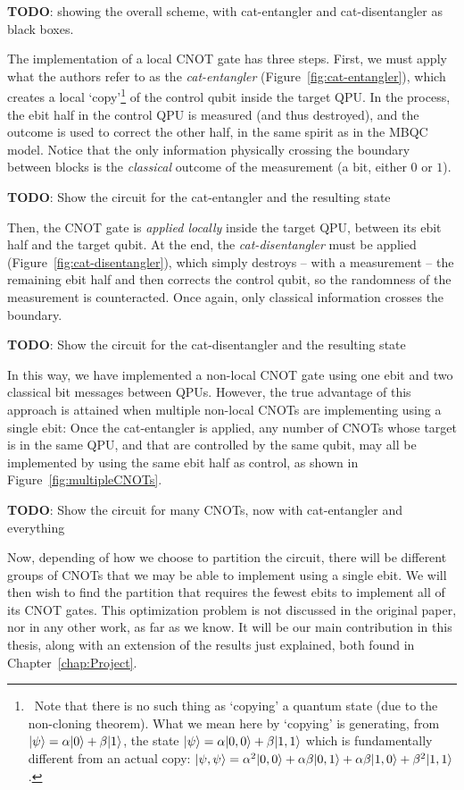 \textbf{TODO}: showing the overall scheme, with cat-entangler and cat-disentangler as black boxes.

The implementation of a local CNOT gate has three steps. First, we must apply what the authors refer to as the \textit{cat-entangler} (Figure~\ref{fig:cat-entangler}), which creates a local `copy'\footnote{\, Note that there is no such thing as `copying' a quantum state (due to the non-cloning theorem). What we mean here by `copying' is generating, from \(\vert \psi \rangle = \alpha\vert 0 \rangle + \beta\vert 1 \rangle\), the state \(\vert \psi \rangle = \alpha\vert 0,0 \rangle + \beta\vert 1,1 \rangle\) which is fundamentally different from an actual copy: \(\vert \psi,\psi \rangle = \alpha^2\vert 0,0 \rangle + \alpha\beta\vert 0,1 \rangle + \alpha\beta\vert 1,0 \rangle + \beta^2\vert 1,1 \rangle\).} of the control qubit inside the target QPU. In the process, the ebit half in the control QPU is measured (and thus destroyed), and the outcome is used to correct the other half, in the same spirit as in the MBQC model. Notice that the only information physically crossing the boundary between blocks is the \textit{classical} outcome of the measurement (a bit, either \(0\) or \(1\)).

\textbf{TODO}: Show the circuit for the cat-entangler and the resulting state

Then, the CNOT gate is \textit{applied locally} inside the target QPU, between its ebit half and the target qubit. At the end, the \textit{cat-disentangler} must be applied (Figure~\ref{fig:cat-disentangler}), which simply destroys -- with a measurement -- the remaining ebit half and then corrects the control qubit, so the randomness of the measurement is counteracted. Once again, only classical information crosses the boundary.

\textbf{TODO}: Show the circuit for the cat-disentangler and the resulting state

In this way, we have implemented a non-local CNOT gate using one ebit and two classical bit messages between QPUs. However, the true advantage of this approach is attained when multiple non-local CNOTs are implementing using a single ebit: Once the cat-entangler is applied, any number of CNOTs whose target is in the same QPU, and that are controlled by the same qubit, may all be implemented by using the same ebit half as control, as shown in Figure~\ref{fig:multipleCNOTs}.

\textbf{TODO}: Show the circuit for many CNOTs, now with cat-entangler and everything

Now, depending of how we choose to partition the circuit, there will be different groups of CNOTs that we may be able to implement using a single ebit. We will then wish to find the partition that requires the fewest ebits to implement all of its CNOT gates. This optimization problem is not discussed in the original paper, nor in any other work, as far as we know. It will be our main contribution in this thesis, along with an extension of the results just explained, both found in Chapter~\ref{chap:Project}.


